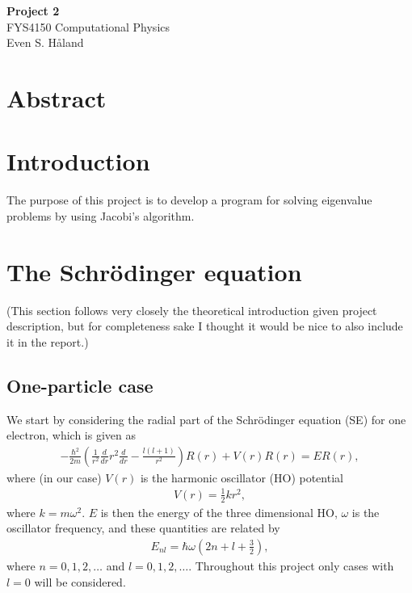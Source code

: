 \documentclass[12pt, a4paper]{article}
\begin{document}
\begin{titlepage}
\begin{center}
\vspace*{3cm}
\Huge
\textbf{Project 2} \\
\Large  
FYS4150 Computational Physics 
\vspace*{3cm} \\ 

Even S. Håland 
\vspace*{5cm} \\

\normalsize
\section*{Abstract}


\end{center}
\end{titlepage}

\section{Introduction}

The purpose of this project is to develop a program for solving eigenvalue problems by using Jacobi's 
algorithm. 

\section{The Schrödinger equation}

(This section follows very closely the theoretical introduction given project description, but 
for completeness sake I thought it would be nice to also include it in the report.) 

\subsection{One-particle case}

We start by considering the radial part of the Schrödinger equation (SE) for one electron, which is 
given as 
\begin{align}
- \frac{\hbar^2}{2m}\left( \frac{1}{r^2} \frac{d}{dr}r^2 \frac{d}{dr} - \frac{l(l+1)}{r^2} \right) R(r) 
+ V(r) R(r) = ER(r),
\label{eq:SE}    
\end{align}    
where (in our case) $V(r)$ is the harmonic oscillator (HO) potential 
\begin{align*}
V(r) = \frac{1}{2} k r^2, 
\end{align*}
where $k = m\omega^2$. $E$ is then the energy of the three dimensional HO, $\omega$ is the 
oscillator frequency, and these quantities are related by 
\begin{align*}
E_{nl} = \hbar \omega \left( 2n + l + \frac{3}{2} \right), 
\end{align*}
where $n = 0,1,2,\dots$ and $l = 0,1,2,\dots$. Throughout this project only cases with $l = 0$ will be 
considered. 
\end{document}
